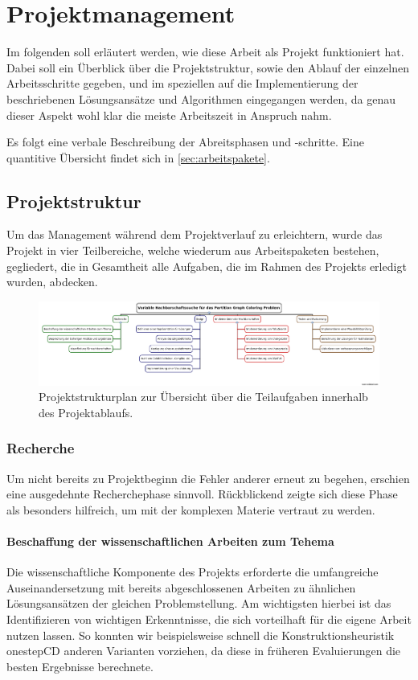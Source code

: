 \section{Projektmanagement}

Im folgenden soll erläutert werden, wie diese Arbeit als Projekt funktioniert hat. Dabei soll ein Überblick über die Projektstruktur, sowie den Ablauf der einzelnen Arbeitsschritte gegeben, und im speziellen auf die Implementierung der beschriebenen Lösungsansätze und Algorithmen eingegangen werden, da genau dieser Aspekt wohl klar die meiste Arbeitszeit in Anspruch nahm.

Es folgt eine verbale Beschreibung der Abreitsphasen und -schritte. Eine quantitive Übersicht findet sich in \ref{sec:arbeitspakete}.

\subsection{Projektstruktur}

Um das Management während dem Projektverlauf zu erleichtern, wurde das Projekt in vier Teilbereiche, welche wiederum aus Arbeitspaketen bestehen, gegliedert, die in Gesamtheit alle Aufgaben, die im Rahmen des Projekts erledigt wurden, abdecken.

\begin{figure}
\centering
\includegraphics[angle=90, height=0.9\textheight]{img/psp.png}
\caption[Projektstrukturplan]{Projektstrukturplan zur Übersicht über die Teilaufgaben innerhalb des Projektablaufs.}
\label{fig:psp}
\end{figure}

\subsubsection{Recherche}

Um nicht bereits zu Projektbeginn die Fehler anderer erneut zu begehen, erschien eine ausgedehnte Recherchephase sinnvoll. Rückblickend zeigte sich diese Phase als besonders hilfreich, um mit der komplexen Materie vertraut zu werden.

\paragraph{Beschaffung der wissenschaftlichen Arbeiten zum Tehema}{Die wissenschaftliche Komponente des Projekts erforderte die umfangreiche Auseinandersetzung mit bereits abgeschlossenen Arbeiten zu ähnlichen Lösungsansätzen der gleichen Problemstellung. Am wichtigsten hierbei ist das Identifizieren von wichtigen Erkenntnisse, die sich vorteilhaft für die eigene Arbeit nutzen lassen. So konnten wir beispielsweise schnell die Konstruktionsheuristik onestepCD anderen Varianten vorziehen, da diese in früheren Evaluierungen die besten Ergebnisse berechnete.} %

